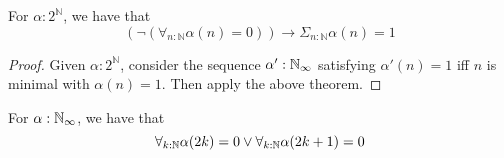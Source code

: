 \begin{corollary}
  For $\alpha:2^\mathbb N$, we have that 
  \begin{equation}
    (\neg (\forall_{n:\mathbb N} \alpha (n)= 0)) \to \Sigma_{n:\mathbb N} \alpha (n)= 1
  \end{equation}
\end{corollary}
\begin{proof}
  Given $\alpha:2^\mathbb N$, consider the sequence $\alpha':\mathbb{N}_{\infty}$ satisfying $\alpha'(n) = 1$ iff 
  $n$ is minimal with $\alpha(n) = 1$. Then apply the above theorem.
\end{proof}

\begin{theorem}\label{LLPO}
  For $\alpha:\mathbb{N}_\infty$, 
  we have that 
  \begin{equation}\label{eqnLLPO}
    \forall_{k:\mathbb{N}} \alpha(2k) = 0  \vee \forall_{k:\mathbb{N}} \alpha(2k+1) = 0
  \end{equation}
\end{theorem}
